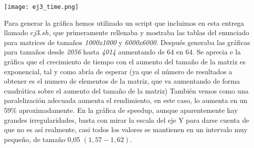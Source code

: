 \documentclass{report}
\newcommand\tab[1][0.6cm]{\hspace*{#1}}
\newcommand\nl{\newline\tab}
\begin{document}
\begin{enumerate}
{			\begin{center}
				\texttt{[image: ej3\_time.png]}
			\end{center}
			
			\tab Para generar la gráfica hemos utilizado un script que incluimos en esta entrega llamado $ ej3.sh $, que primeramente rellenaba y mostraba las tablas del enunciado para matrices de tamaños \textit{1000x1000} y \textit{6000x6000}. Después generaba las gráficas para tamaños desde \textit{2056} hasta \textit{4014} aumentando de 64 en 64.\nl
			Se aprecia e la gráfica que el crecimiento de tiempo con el aumento del tamaño de la matriz es exponencial, tal y como abría de esperar (ya que el número de resultados a obtener es el numero de elementos de la matriz, que va aumentando de forma cuadrática sobre el aumento del tamaño de la matriz) También vemos como una paralelización adecuada aumenta el rendimiento, en este caso, lo aumenta en un 59\% aproximadamente. En la gráfica de speedup, aunque aparentemente hay grandes irregularidades, basta con mirar la escala del eje Y para darse cuenta de que no es así realmente, casi todos los valores se mantienen en un intervalo muy pequeño, de tamaño 0,05 $(1,57 - 1,62)$.
		}
	\end{enumerate}
	\newpage
\end{document}
